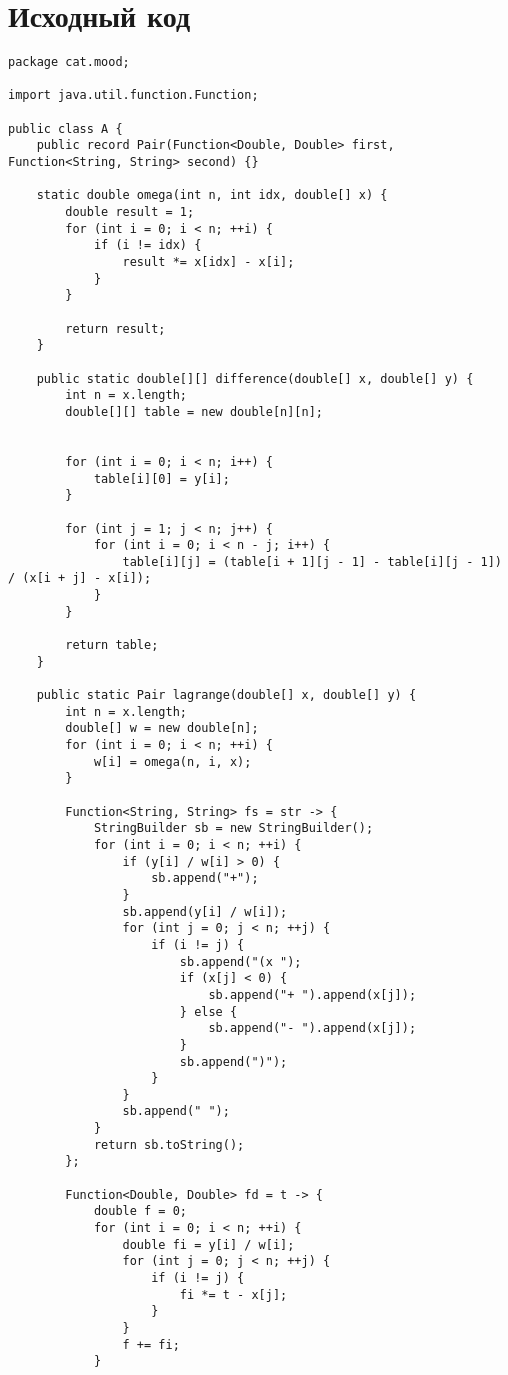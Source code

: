 \section*{Исходный код}

\begin{verbatim}
package cat.mood;

import java.util.function.Function;

public class A {
    public record Pair(Function<Double, Double> first, Function<String, String> second) {}

    static double omega(int n, int idx, double[] x) {
        double result = 1;
        for (int i = 0; i < n; ++i) {
            if (i != idx) {
                result *= x[idx] - x[i];
            }
        }

        return result;
    }

    public static double[][] difference(double[] x, double[] y) {
        int n = x.length;
        double[][] table = new double[n][n];


        for (int i = 0; i < n; i++) {
            table[i][0] = y[i];
        }

        for (int j = 1; j < n; j++) {
            for (int i = 0; i < n - j; i++) {
                table[i][j] = (table[i + 1][j - 1] - table[i][j - 1]) / (x[i + j] - x[i]);
            }
        }

        return table;
    }

    public static Pair lagrange(double[] x, double[] y) {
        int n = x.length;
        double[] w = new double[n];
        for (int i = 0; i < n; ++i) {
            w[i] = omega(n, i, x);
        }

        Function<String, String> fs = str -> {
            StringBuilder sb = new StringBuilder();
            for (int i = 0; i < n; ++i) {
                if (y[i] / w[i] > 0) {
                    sb.append("+");
                }
                sb.append(y[i] / w[i]);
                for (int j = 0; j < n; ++j) {
                    if (i != j) {
                        sb.append("(x ");
                        if (x[j] < 0) {
                            sb.append("+ ").append(x[j]);
                        } else {
                            sb.append("- ").append(x[j]);
                        }
                        sb.append(")");
                    }
                }
                sb.append(" ");
            }
            return sb.toString();
        };

        Function<Double, Double> fd = t -> {
            double f = 0;
            for (int i = 0; i < n; ++i) {
                double fi = y[i] / w[i];
                for (int j = 0; j < n; ++j) {
                    if (i != j) {
                        fi *= t - x[j];
                    }
                }
                f += fi;
            }


\end{verbatim}
